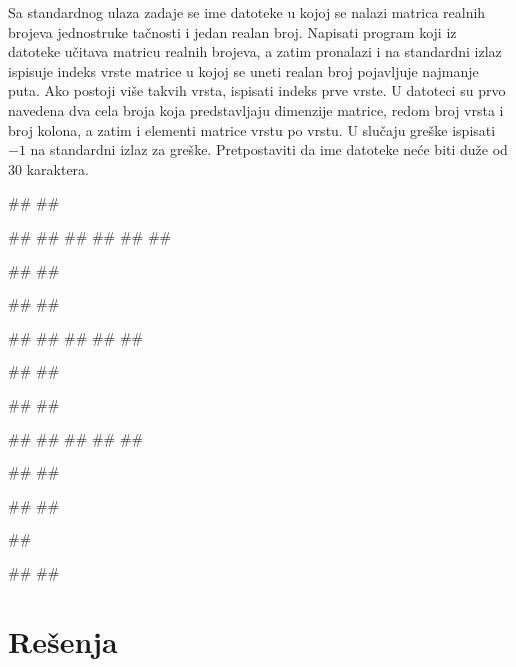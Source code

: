 \begin{Exercise}[label=A_12]
Sa standardnog ulaza zadaje se ime datoteke u kojoj se nalazi matrica realnih brojeva jednostruke tačnosti
i jedan realan broj. Napisati program koji iz datoteke učitava matricu realnih brojeva, a zatim pronalazi i na standardni
izlaz ispisuje indeks vrste matrice u kojoj se uneti realan broj pojavljuje najmanje puta. Ako postoji više takvih vrsta,
ispisati indeks prve vrste. U datoteci su prvo navedena dva cela broja koja predstavljaju dimenzije matrice, redom broj
vrsta i broj kolona, a zatim i elementi matrice vrstu po vrstu. U slučaju greške ispisati $-1$ na standardni izlaz za greške.
Pretpostaviti da ime datoteke neće biti duže od $30$ karaktera. 

\begin{minitest}
\begin{test}{1}
#\naslovUlaz#
##

##
##
##
##
##
##

#\naslovIzlaz#
##
\end{test}
\end{minitest}
\begin{minitest}
\begin{test}{2}
#\naslovUlaz#
##

##
##
##
##
##

#\naslovIzlaz#
##
\end{test}
\end{minitest}

\begin{minitest}
\begin{test}{3}
#\naslovUlaz#
##

##
##
##
##
##

#\naslovIzlaz#
##
\end{test}
\end{minitest}
\begin{minitest}
\begin{test}{4}
#\naslovUlaz#
##

##

#\naslovIzlazZaGresku#
##
\end{test}
\end{minitest}

\end{Exercise}
\begin{Answer}[ref=A_12]
\end{Answer}

\section{Rešenja}
\shipoutAnswer
